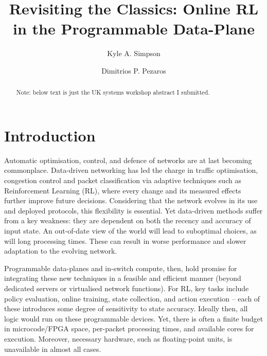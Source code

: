 \documentclass[sigconf,natbib=false]{acmart}
\begin{document}
	\title{Revisiting the Classics: Online RL in the Programmable Data-Plane}
	
	
	 \author{Kyle A. Simpson}
	 \author{Dimitrios P. Pezaros}
	
	\renewcommand{\shortauthors}{Simpson \emph{et al}.}
	
\begin{abstract}
Note: below text is just the UK systems workshop abstract I submitted.	
\end{abstract}
	
\maketitle
	
\section{Introduction}

Automatic optimisation, control, and defence of networks are at last becoming commonplace. Data-driven networking has led the charge in traffic optimisation, congestion control and packet classification via adaptive techniques such as Reinforcement Learning (RL), where every change and its measured effects further improve future decisions. Considering that the network evolves in its use and deployed protocols, this flexibility is essential. Yet data-driven methods suffer from a key weakness: they are dependent on both the recency and accuracy of input state. An out-of-date view of the world will lead to suboptimal choices, as will long processing times. These can result in worse performance and slower adaptation to the evolving network.

Programmable data-planes and in-switch compute, then, hold promise for integrating these new techniques in a feasible and efficient manner (beyond dedicated servers or virtualised network functions). For RL, key tasks include policy evaluation, online training, state collection, and action execution -- each of these introduces some degree of sensitivity to state accuracy. Ideally then, all logic would run on these programmable devices. Yet, there is often a finite budget in microcode/FPGA space, per-packet processing times, and available cores for execution. Moreover, necessary hardware, such as floating-point units, is unavailable in almost all cases.
\end{document}
